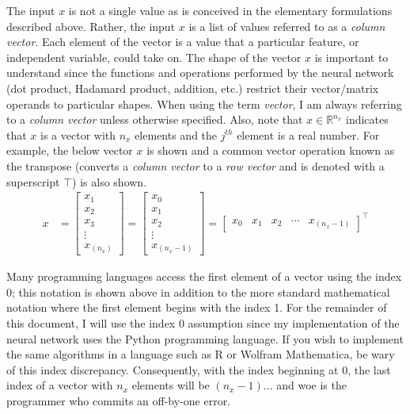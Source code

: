 \documentclass{article}
\begin{document}
\quad The input $x$ is not a single value as is conceived in the elementary
formulations described above. Rather, the input $x$ is a list of
values referred to as a \textit{column vector}. Each element of the vector
is a value that a particular feature, or independent variable, could take on.
The shape of the vector $x$ is important to understand since the functions and operations
performed by the neural network (dot product, Hadamard product, addition, etc.)
restrict their vector/matrix operands to particular shapes. When using the term
\textit{vector}, I am always referring to a \textit{column vector}
unless otherwise specified. Also, note that $x \in \mathbb{R}^{n_x}$ indicates
that $x$ is a vector with $n_x$ elements and the $j^{th}$ element is a real number.
For example, the below vector $x$ is shown and a common vector operation
known as the transpose (converts a \textit{column vector} to a
\textit{row vector} and is denoted with a superscript $\top$) is also shown.
\begin{align}
	x & = \begin{bmatrix}
		x_{1}  \\
		x_{2}  \\
		x_{3}  \\
		\vdots \\
		x_{(n_x)}
	\end{bmatrix}
	=
	\begin{bmatrix}
		x_{0}  \\
		x_{1}  \\
		x_{2}  \\
		\vdots \\
		x_{(n_{x}-1)}
	\end{bmatrix}
	=
	\begin{bmatrix}
		x_{0} & x_{1} & x_{2} & \cdots & x_{(n_{x}-1)}
	\end{bmatrix}^\top
\end{align}

Many programming languages access the first element of a vector using the index
0; this notation is shown above in addition to the more standard
mathematical notation where the first element begins with the index 1.
For the remainder of this document, I will use the index 0 assumption
since my implementation of the neural network uses the Python
programming language. If you wish to implement the same algorithms in a language
such as R or Wolfram Mathematica, be wary of this index discrepancy.
Consequently, with the index beginning at 0, the last index of a vector with
$n_x$ elements will be $(n_x - 1)$... and woe is the programmer who commits an
off-by-one error.
\end{document}
